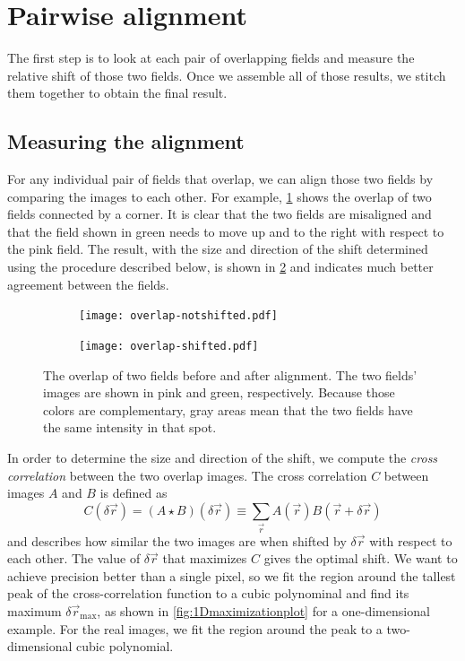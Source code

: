 \documentclass{article}
\begin{document}
\section{Pairwise alignment}
\label{sec:pairwise}

The first step is to look at each pair of overlapping fields and measure the relative shift of those two fields.  Once we assemble all of those results, we stitch them together to obtain the final result.

\subsection{Measuring the alignment}
\label{sec:measuringalignment}

For any individual pair of fields that overlap, we can align those two fields by comparing the images to each other.  For example, \cref{fig:overlapbefore} shows the overlap of two fields connected by a corner.  It is clear that the two fields are misaligned and that the field shown in green needs to move up and to the right with respect to the pink field.  The result, with the size and direction of the shift determined using the procedure described below, is shown in \cref{fig:overlapafter} and indicates much better agreement between the fields.

\begin{figure}[ht]
	\centering
	\begin{subfigure}{0.45\linewidth}
	\texttt{[image: overlap-notshifted.pdf]}
	\caption{}
	\label{fig:overlapbefore}
	\end{subfigure}
	\begin{subfigure}{0.45\linewidth}
	\texttt{[image: overlap-shifted.pdf]}
	\caption{}
	\label{fig:overlapafter}
	\end{subfigure}
	\caption{The overlap of two fields  before and  after alignment.  The two fields' images are shown in pink and green, respectively.  Because those colors are complementary, gray areas mean that the two fields have the same intensity in that spot.}
	\label{fig:overlap}
\end{figure}

In order to determine the size and direction of the shift, we compute the \emph{cross correlation} between the two overlap images.  The cross correlation $C$ between images $A$ and $B$ is defined as
\begin{equation}
C(\delta\vec{r})=(A\star B)(\delta\vec{r})\equiv\sum_{\vec{r}} {A(\vec{r})B(\vec{r}+\delta\vec{r})}
\label{eq:xcorrelation}
\end{equation}
and describes how similar the two images are when shifted by $\delta\vec{r}$ with respect to each other.  The value of $\delta\vec{r}$ that maximizes $C$ gives the optimal shift.  We want to achieve precision better than a single pixel, so we fit the region around the tallest peak of the cross-correlation function to a cubic polynominal and find its maximum $\delta\vec{r}_\text{max}$, as shown in \cref{fig:1Dmaximizationplot} for a one-dimensional example.  For the real images, we fit the region around the peak to a two-dimensional cubic polynomial.
\end{document}
